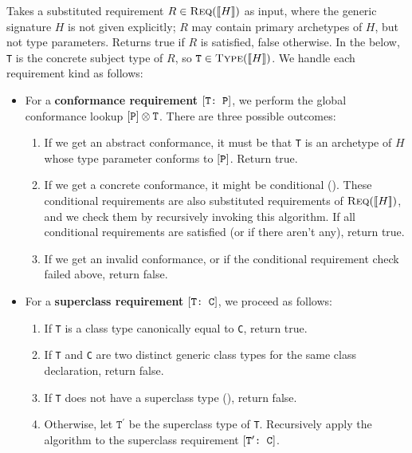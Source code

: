 \documentclass[../generics]{subfiles}
\begin{document}
\begin{algorithm}\label{reqissatisfied}
Takes a substituted requirement $R\in\textsc{Req}({[\![H]\!]})$ as input, where the generic signature $H$ is not given explicitly; $R$ may contain primary archetypes of $H$, but not type parameters. Returns true if $R$ is satisfied, false otherwise. In the below, \texttt{T} is the concrete subject type of $R$, so $\texttt{T}\in\textsc{Type}({[\![H]\!]})$. We handle each requirement kind as follows:
\begin{itemize}
\item For a \textbf{conformance requirement} $[\texttt{T:~P}]$, we perform the global conformance lookup $[\texttt{P}]\otimes\texttt{T}$. There are three possible outcomes:
\begin{enumerate}
\item If we get an abstract conformance, it must be that \texttt{T} is an archetype of $H$ whose type parameter conforms to $[\texttt{P}]$. Return true.
\item If we get a concrete conformance, it might be conditional (). These conditional requirements are also substituted requirements of $\textsc{Req}({[\![H]\!]})$, and we check them by recursively invoking this algorithm. If all conditional requirements are satisfied (or if there aren't any), return true.
\item If we get an invalid conformance, or if the conditional requirement check failed above, return false.
\end{enumerate}
\item For a \textbf{superclass requirement} $[\texttt{T:~C}]$, we proceed as follows:
\begin{enumerate}
\item If \texttt{T} is a class type canonically equal to \texttt{C}, return true.
\item If \texttt{T} and \texttt{C} are two distinct generic class types for the same class declaration, return false.
\item If \texttt{T} does not have a superclass type (), return false.
\item Otherwise, let $\texttt{T}^\prime$ be the superclass type of \texttt{T}. Recursively apply the algorithm to the superclass requirement $[\texttt{$\texttt{T}^\prime$:~C}]$.

\end{enumerate}
\end{itemize}
\end{algorithm}
\end{document}
